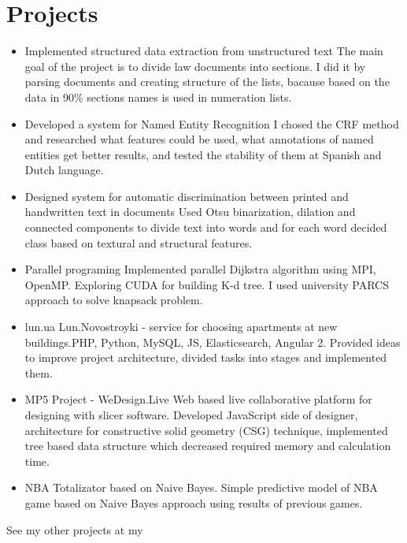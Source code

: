 \documentclass[letterpaper]{twentysecondcv} %
\begin{document}
\section{Projects}
\begin{itemize}
    \item \projectItem
        {Implemented structured data extraction from unstructured text }
        {The main goal of the project is to divide law documents into sections. I did it by parsing documents and creating structure of the lists, bacause based on the data in 90\% sections names is used in numeration lists.}

	\item \projectItem
        {Developed a system for Named Entity Recognition}
        {I chosed the CRF method and researched what features could be used, what annotations of named entities get better results, and tested the stability of them at Spanish and Dutch language.}
	
    \item \projectItem
        {Designed system for automatic discrimination between printed and handwritten text in documents}
        {Used Otsu binarization, dilation and connected components to divide text into words and for each word decided class based on textural and structural features.}
	\item \projectItem
        {Parallel programing}
        {Implemented parallel Dijkstra algorithm using MPI, OpenMP. Exploring CUDA for building K-d tree. I used university PARCS approach to solve knapsack problem.}
	\item \projectItem
        {lun.ua}
        {Lun.Novostroyki - service for choosing apartments at new buildings.PHP, Python, MySQL, JS, Elasticsearch, Angular 2. Provided ideas to improve project architecture, divided tasks into stages and implemented them. }
    \item \projectItem
        {MP5 Project - WeDesign.Live}
        {Web based live collaborative platform for designing with slicer software. Developed JavaScript side of designer, architecture for constructive solid geometry (CSG) technique, implemented tree based data structure which decreased required memory and calculation time.}
	\item \projectItem
        {NBA Totalizator based on Naive Bayes.}
        {Simple predictive model of NBA game based on Naive Bayes approach using results of previous games.}
	\end{itemize}
\projectItem
    {See my other projects at my  }
    {}
\end{document}
